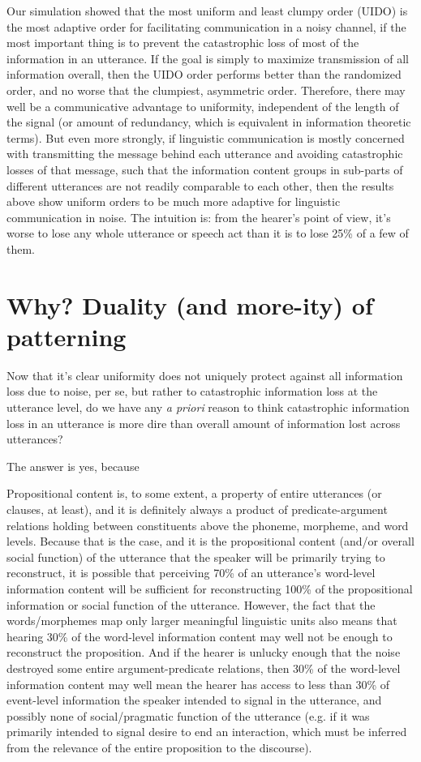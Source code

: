 \documentclass[12pt]{article}
\begin{document}
Our simulation showed that the most uniform and least clumpy order (UIDO) is the most adaptive order for facilitating communication in a noisy channel, if the most important thing is to prevent the catastrophic loss of most of the information in an utterance. If the goal is simply to maximize transmission of all information overall, then the UIDO order performs better than the randomized order, and no worse that the clumpiest, asymmetric order. Therefore, there may well be a communicative advantage to uniformity, independent of the length of the signal (or amount of redundancy, which is equivalent in information theoretic terms). But even more strongly, if linguistic communication is mostly concerned with transmitting the message behind each utterance and avoiding catastrophic losses of that message, such that the information content groups in sub-parts of different utterances are not readily comparable to each other, then the results above show uniform orders to be much more adaptive for linguistic communication in noise. The intuition is: from the hearer's point of view, it's worse to lose any whole utterance or speech act than it is to lose 25\% of a few of them.


\section{Why? Duality (and more-ity) of patterning}
\label{moreity}

Now that it's clear uniformity does not uniquely protect against all information loss due to noise, per se, but rather to catastrophic information loss at the utterance level, do we have any \textsl{a priori} reason to think catastrophic information loss in an utterance is more dire than overall amount of information lost across utterances? 

The answer is yes, because %

Propositional content is, to some extent, a property of entire utterances (or clauses, at least), and it is definitely always a product of predicate-argument relations holding between constituents above the phoneme, morpheme, and word levels. Because that is the case, and it is the propositional content (and/or overall social function) of the utterance that the speaker will be primarily trying to reconstruct, it is possible that perceiving 70\% of an utterance's word-level information content will be sufficient for reconstructing 100\% of the propositional information or social function of the utterance. However, the fact that the words/morphemes map only larger meaningful linguistic units also means that hearing 30\% of the word-level information content may well not be enough to reconstruct the proposition. And if the hearer is unlucky enough that the noise destroyed some entire argument-predicate relations, then 30\% of the word-level information content may well mean the hearer has access to less than 30\% of event-level information the speaker intended to signal in the utterance, and possibly none of social/pragmatic function of the utterance (e.g. if it was primarily intended to signal desire to end an interaction, which must be inferred from the relevance of the entire proposition to the discourse). 
\end{document}
